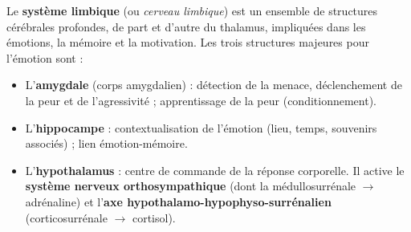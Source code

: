 \documentclass[11pt]{article}
\begin{document}
\begin{definition}
Le \textbf{système limbique} (ou \emph{cerveau limbique}) est un ensemble de structures cérébrales profondes, de part et d'autre du thalamus, impliquées dans les émotions, la mémoire et la motivation. Les trois structures majeures pour l'émotion sont :
\begin{itemize}
  \item L'\textbf{amygdale} (corps amygdalien) : détection de la menace, déclenchement de la peur et de l'agressivité ; apprentissage de la peur (conditionnement).
  \item L'\textbf{hippocampe} : contextualisation de l'émotion (lieu, temps, souvenirs associés) ; lien émotion-mémoire.
  \item L'\textbf{hypothalamus} : centre de commande de la réponse corporelle. Il active le \textbf{système nerveux orthosympathique} (dont la médullosurrénale $\rightarrow$ adrénaline) et l'\textbf{axe hypothalamo-hypophyso-surrénalien} (corticosurrénale $\rightarrow$ cortisol).
\end{itemize}
\end{definition}
\end{document}
